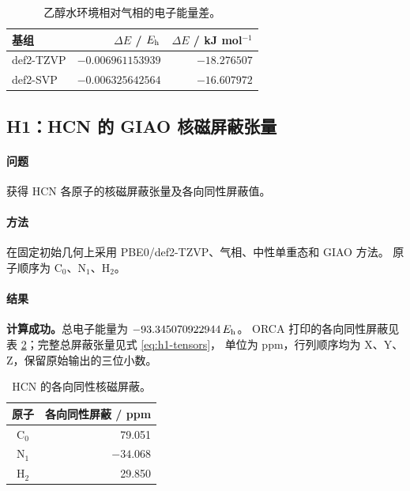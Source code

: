 \begin{table}[H]
  \centering\small
  \caption{乙醇水环境相对气相的电子能量差。%
  }
  \label{tab:t5-differences}
  \begin{tabular}{lrr}
    \toprule
    基组 & $\Delta E$ / $E_{\mathrm h}$ & $\Delta E$ / kJ mol$^{-1}$\\
    \midrule
    def2-TZVP & $-0.006961153939$ & $-18.276507$\\
    def2-SVP & $-0.006325642564$ & $-16.607972$\\
    \bottomrule
  \end{tabular}
\end{table}

\subsection{H1：HCN 的 GIAO 核磁屏蔽张量}
\paragraph{问题}
获得 HCN 各原子的核磁屏蔽张量及各向同性屏蔽值。

\paragraph{方法}
在固定初始几何上采用 PBE0/def2-TZVP、气相、中性单重态和 GIAO 方法。%
原子顺序为 C$_0$、N$_1$、H$_2$。

\paragraph{结果}
\textbf{计算成功。}总电子能量为 $-93.345070922944\,E_{\mathrm h}$。%
ORCA 打印的各向同性屏蔽见表 \ref{tab:h1-isotropic}；完整总屏蔽张量见式 \eqref{eq:h1-tensors}，%
单位为 ppm，行列顺序均为 X、Y、Z，保留原始输出的三位小数。

\begin{table}[H]
  \centering\small
  \caption{HCN 的各向同性核磁屏蔽。%
  }
  \label{tab:h1-isotropic}
  \begin{tabular}{cr}
    \toprule
    原子 & 各向同性屏蔽 / ppm\\
    \midrule
    C$_0$ & 79.051\\
    N$_1$ & $-34.068$\\
    H$_2$ & 29.850\\
    \bottomrule
  \end{tabular}
\end{table}

